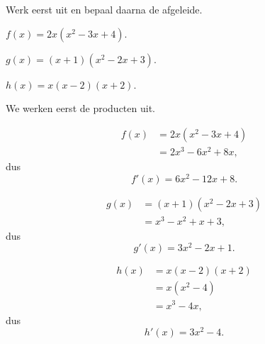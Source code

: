 \documentclass{ximera}
\begin{document}
\begin{oefening}{\oefB\ESS}

Werk eerst uit en bepaal daarna de afgeleide.

\begin{question}

\(
f(x)=2x(x^2-3x+4).
\)

\end{question}

\begin{question}

\(
g(x)=(x+1)(x^2-2x+3).
\)

\end{question}

\begin{question}

\(
h(x)=x(x-2)(x+2).
\)

\end{question}

\begin{oplossing}

We werken eerst de producten uit.

\[
\begin{aligned}
f(x)
&=2x(x^2-3x+4)\\
&=2x^3-6x^2+8x,
\end{aligned}
\]
dus
\[
\boxed{f'(x)=6x^2-12x+8}.
\]

\[
\begin{aligned}
g(x)
&=(x+1)(x^2-2x+3)\\
&=x^3-x^2+x+3,
\end{aligned}
\]
dus
\[
\boxed{g'(x)=3x^2-2x+1}.
\]

\[
\begin{aligned}
h(x)
&=x(x-2)(x+2)\\
&=x(x^2-4)\\
&=x^3-4x,
\end{aligned}
\]
dus
\[
\boxed{h'(x)=3x^2-4}.
\]

\end{oplossing}

\end{oefening}


\end{document}
